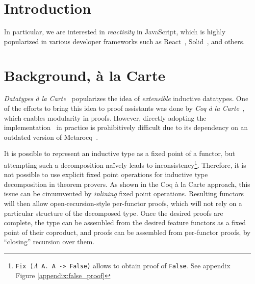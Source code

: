 \documentclass[sigplan,nonacm]{acmart}
\begin{document}


\maketitle

\section{Introduction}


In particular,
we are interested in \emph{reactivity} in JavaScript,
which is highly popularized in various developer frameworks
such as React~\cite{React}, Solid~\cite{Solid}, and others.

\section{Background, à la Carte}

\emph{Datatypes à la Carte}~\cite{swierstra2008data}
popularizes the idea of
\emph{extensible} inductive datatypes. 
One of the efforts to bring this idea to proof assistants
was done by \emph{Coq à la Carte}~\cite{forster2020coq},
which enables modularity in proofs.
However,
directly adopting the implementation~\cite{forster2020coq} in practice
is prohibitively difficult
due to its dependency on an outdated version of Metarocq~\cite{sozeau2020metacoq}.

It is possible to represent an inductive type as a fixed point of a functor,
but attempting such a decomposition na\"ively leads to inconsistency\footnote{\texttt{Fix ($\Lambda$ A. A -> False)} allows to obtain proof of \texttt{False}. See appendix Figure \ref{appendix:false_proof}}. 
Therefore, it is not possible to use explicit fixed point operations for inductive type decomposition in theorem provers.
As shown in the Coq à la Carte approach,
this issue can be circumvented by \emph{inlining} fixed point operations.  
Resulting functors will then allow open-recursion-style per-functor proofs,
which will not rely on a particular structure of the decomposed type.
Once the desired proofs are complete,
the type can be assembled from the desired feature functors as a fixed point of their coproduct,
and proofs can be assembled from
per-functor proofs,
by ``closing'' recursion over them.
\end{document}
